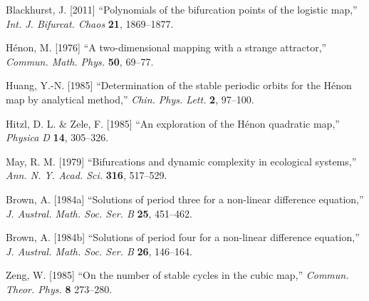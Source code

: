 \documentclass{ws-ijbc}
\begin{document}
\begin{thebibliography}{50}
  Blackhurst, J. [2011]
  ``Polynomials of the bifurcation points of the logistic map,''
  {\it Int. J. Bifurcat. Chaos}
  \textbf{21},
  1869--1877.

  H\'enon, M. [1976]
  ``A two-dimensional mapping with a strange attractor,''
  {\it Commun. Math. Phys.}
  \textbf{50},
  69--77.

  Huang, Y.-N. [1985]
  ``Determination of the stable periodic orbits for the H\'enon map by analytical method,''
  {\it Chin. Phys. Lett.}
  \textbf{2},
  97--100.

  Hitzl, D. L. \& Zele, F. [1985]
  ``An exploration of the H\'enon quadratic map,''
  {\it Physica D}
  \textbf{14},
  305--326.

  May, R. M. [1979]
  ``Bifurcations and dynamic complexity in ecological systems,''
  {\it Ann. N. Y. Acad. Sci.}
  \textbf{316},
  517--529.

  Brown, A. [1984a]
  ``Solutions of period three for a non-linear difference equation,''
  {\it J. Austral. Math. Soc. Ser. B}
  \textbf{25},
  451--462.

  Brown, A. [1984b]
  ``Solutions of period four for a non-linear difference equation,''
  {\it J. Austral. Math. Soc. Ser. B}
  \textbf{26},
  146--164.

  Zeng, W. [1985]
  ``On the number of stable cycles in the cubic map,''
  {\it Commun. Theor. Phys.}
  \textbf{8}
  273--280.

\end{thebibliography}


\end{document}
